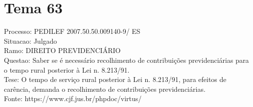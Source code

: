 \documentclass[12pt]{article}
\begin{document}
\section*{Tema 63}
Processo: PEDILEF 2007.50.50.009140-9/ ES\\
Situacao: Julgado\\
Ramo: DIREITO PREVIDENCIÁRIO\\
Questao: Saber se é necessário recolhimento de contribuições previdenciárias para o tempo rural posterior à Lei n. 8.213/91.\\
Tese: O tempo de serviço rural posterior à Lei n. 8.213/91, para efeitos de carência, demanda o recolhimento de contribuições previdenciárias.\\
Fonte: https://www.cjf.jus.br/phpdoc/virtus/
\end{document}
